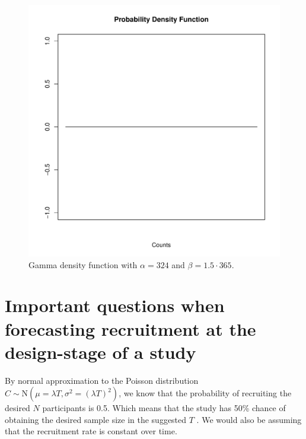\begin{figure}
\begin{knitrout}
\color{fgcolor}

{\centering \includegraphics[width=\textwidth-3cm]{figure/ch02_figunnamed-chunk-9-1} 

}


\end{knitrout}
  \caption{Gamma density function with $\alpha = 324$ and $\beta = 1.5 \cdot 365$.}
  \label{fig:2_8}
\end{figure}



\section{Important questions when forecasting recruitment at the design-stage of a study}

By normal approximation to the Poisson distribution $C\sim \textrm{N}(\mu=\lambda T, \sigma^2=(\lambda T)^2)$, we know that the probability of recruiting the desired $N$ participants is 0.5. Which means that the study has 50\% chance of obtaining the desired sample size in the suggested $T$ \citep{carter2004application}. We would also be assuming that the recruitment rate is constant over time.

